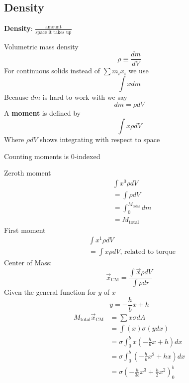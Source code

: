 \documentclass{article}
\begin{document}
\subsection{Density}

\textbf{Density}: $ \frac{\text{amount}}{\text{space it takes up}} $

Volumetric mass density
$$ \rho \equiv \frac{dm}{dV} $$
For continuous solids instead of $ \sum m_ix_i $ we use
$$ \int x dm $$
Because $ dm $ is hard to work with we say
$$ dm = \rho dV $$
A \textbf{moment} is defined by
$$ \int x\rho dV $$
Where $ \rho dV $ shows integrating with respect to space

Counting moments is $ 0 $-indexed

Zeroth moment
\begin{align*}
    & \int x^0\rho dV \\
    & = \int\rho dV \\
    & = \int_0^{M_\text{total}}dm \\
    & = M_{\text{total}}
\end{align*}
First moment
\begin{align*}
    & \int x^1\rho dV \\
    & = \int x\rho dV \text{, related to torque}
\end{align*}
Center of Mass:
$$ \vec{x}_{\text{CM}} = \frac{\int \vec{x}\rho dV}{\int \rho dr} $$
Given the general function for $ y $ of $ x $
$$ y = -\frac{h}{b}x + h $$
\begin{align*}
    M_{\text{total}}\vec{x}_{\text{CM}} & = \sum x\sigma dA \\
                        & = \int (x)\sigma(ydx) \\
                        & = \sigma \int_0^b x(-\frac{h}{b}x + h)dx \\
                        & = \sigma \int_0^b \left(-\frac{h}{b}x^2 + hx\right)dx \\
                        & = \sigma \left(-\frac{h}{3b}x^3 + \frac{h}{2}x^2\right)_0^b
\end{align*}
\end{document}
